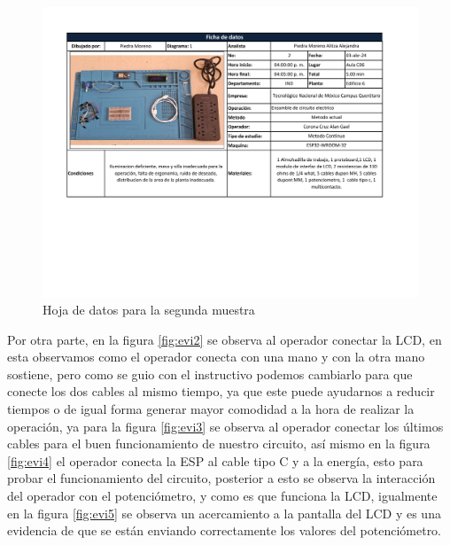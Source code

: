     \begin{figure}[H]
        \centering
        \includegraphics[trim = {17mm 70mm 25mm 15mm},clip,scale=0.37]{22/Img/hojaDeDatos2.pdf}
        \caption{Hoja de datos para la segunda muestra}
        \label{fig:hoja2}
    \end{figure}
    
     
     Por otra parte, en la figura \ref{fig:evi2} se observa al operador conectar la LCD, en esta observamos como el operador conecta con una mano y con la otra mano sostiene, pero como se guio con el instructivo podemos cambiarlo para que conecte los dos cables al mismo tiempo, ya que este puede ayudarnos a reducir tiempos o de igual forma generar mayor comodidad a la hora de realizar la operación, ya para la figura \ref{fig:evi3} se observa  al operador conectar los últimos cables para el buen funcionamiento de nuestro circuito, así mismo en la figura \ref{fig:evi4} el operador conecta la ESP al cable tipo C y a la energía, esto para probar el funcionamiento del circuito, posterior a esto se observa la interacción del operador con el potenciómetro, y como es que funciona la LCD, igualmente en la figura \ref{fig:evi5} se observa un acercamiento a la pantalla del LCD y es una evidencia de que se están enviando correctamente los valores del potenciómetro.
    
